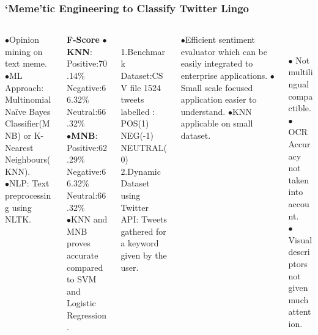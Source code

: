 \documentclass[]{beamer}
\begin{document}
\begin{frame}\frametitle{ ‘Meme’tic Engineering to Classify Twitter Lingo\cite{memeticEnggTwitter}}
\begin{columns}
	\begin{column}{0.20\textwidth}
		{}
		
		$\bullet$Opinion mining on text meme.\\
		$\bullet$ML Approach: Multinomial Na\"ive Bayes Classifier(MNB) or K-Nearest Neighbours(KNN).\\
		$\bullet$NLP: Text preprocessing using NLTK.
	\end{column}
	\begin{column}{0.23\textwidth}
		{}
	\textbf{F-Score}
		$\bullet${\color{blue}\textbf{KNN}}:\\
		Positive:70.14\%\\
		Negative:66.32\%\\
		Neutral:66.32\%\\
		$\bullet${\color{blue}\textbf{MNB}}:\\
		Positive:62.29\%\\
		Negative:66.32\%\\
		Neutral:66.32\%\\
		$\bullet$KNN and MNB proves accurate compared to SVM and Logistic Regression.
	\end{column}
	\begin{column}{0.20\textwidth}
		{}\\
		1.Benchmark Dataset:CSV file
		1524 tweets labelled :
		POS(1)\\
		NEG(-1)\\
		NEUTRAL(0)\\
		2.Dynamic Dataset using Twitter API: Tweets gathered for a keyword given by the user.
		\end{column}
	\begin{column}{0.20\textwidth}
		{}
		\begin{center}
		$\bullet$Efficient sentiment evaluator which can be easily integrated to enterprise applications.
		$\bullet$Small scale focused application easier to understand.
		$\bullet$KNN applicable on small dataset.
		\end{center}
	\end{column}
	\begin{column}{0.20\textwidth}
		{}\\
		\begin{center}
			$\bullet$ Not multilingual compactible.\\
			$\bullet$ OCR Accuracy not taken into account.\\
			$\bullet$ Visual descriptors not given much attention.
		\end{center}
	\end{column}
	
\end{columns}
\end{frame}
\end{document}
